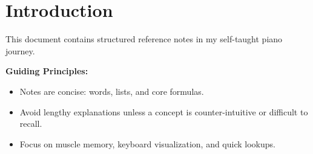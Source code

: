 
\section{Introduction}

This document contains structured reference notes in my self-taught piano journey.

\textbf{Guiding Principles:}
\begin{itemize}
    \item Notes are concise: words, lists, and core formulas.
    \item Avoid lengthy explanations unless a concept is counter-intuitive or difficult to recall.
    \item Focus on muscle memory, keyboard visualization, and quick lookups.
\end{itemize}
